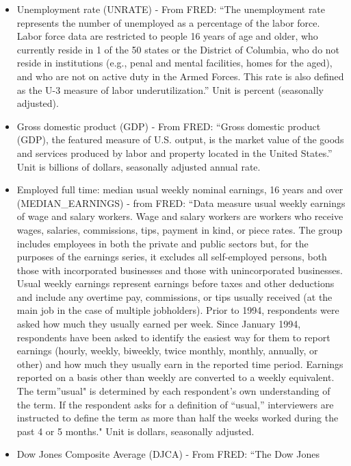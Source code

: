 \documentclass[
]{article}
\providecommand{\tightlist}{%
  \setlength{\itemsep}{0pt}\setlength{\parskip}{0pt}}
\begin{document}
\begin{itemize}
\tightlist
\item
  Unemployment rate (UNRATE) - From FRED: ``The unemployment rate
  represents the number of unemployed as a percentage of the labor
  force. Labor force data are restricted to people 16 years of age and
  older, who currently reside in 1 of the 50 states or the District of
  Columbia, who do not reside in institutions (e.g., penal and mental
  facilities, homes for the aged), and who are not on active duty in the
  Armed Forces. This rate is also defined as the U-3 measure of labor
  underutilization.'' Unit is percent (seasonally adjusted).
\item
  Gross domestic product (GDP) - From FRED: ``Gross domestic product
  (GDP), the featured measure of U.S. output, is the market value of the
  goods and services produced by labor and property located in the
  United States.'' Unit is billions of dollars, seasonally adjusted
  annual rate.
\item
  Employed full time: median usual weekly nominal earnings, 16 years and
  over (MEDIAN\_EARNINGS) - from FRED: ``Data measure usual weekly
  earnings of wage and salary workers. Wage and salary workers are
  workers who receive wages, salaries, commissions, tips, payment in
  kind, or piece rates. The group includes employees in both the private
  and public sectors but, for the purposes of the earnings series, it
  excludes all self-employed persons, both those with incorporated
  businesses and those with unincorporated businesses. Usual weekly
  earnings represent earnings before taxes and other deductions and
  include any overtime pay, commissions, or tips usually received (at
  the main job in the case of multiple jobholders). Prior to 1994,
  respondents were asked how much they usually earned per week. Since
  January 1994, respondents have been asked to identify the easiest way
  for them to report earnings (hourly, weekly, biweekly, twice monthly,
  monthly, annually, or other) and how much they usually earn in the
  reported time period. Earnings reported on a basis other than weekly
  are converted to a weekly equivalent. The term''usual" is determined
  by each respondent's own understanding of the term. If the respondent
  asks for a definition of ``usual,'' interviewers are instructed to
  define the term as more than half the weeks worked during the past 4
  or 5 months." Unit is dollars, seasonally adjusted.
\item
  Dow Jones Composite Average (DJCA) - From FRED: ``The Dow Jones

\end{itemize}
\end{document}
